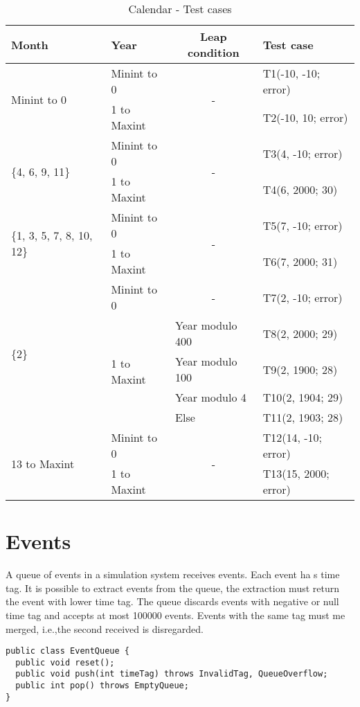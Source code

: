 \begin{table}
\centering
\small
\begin{tabular}{|l|l|c|l|}
\hline
\textbf{Month} & \textbf{Year} & \textbf{Leap condition} & \textbf{Test case} \\
\hline
\multirow{2}{*}{Minint to 0} & Minint to 0 & \multirow{2}{*}{-} & T1(-10, -10; error) \\
\cline{2-2} \cline{4-4}
& 1 to Maxint & & T2(-10, 10; error) \\
\hline
\multirow{2}{*}{\{4, 6, 9, 11\}} & Minint to 0 & \multirow{2}{*}{-} & T3(4, -10; error) \\
\cline{2-2} \cline{4-4}
& 1 to Maxint & & T4(6, 2000; 30) \\
\hline
\multirow{2}{*}{\{1, 3, 5, 7, 8, 10, 12\}} & Minint to 0 & \multirow{2}{*}{-} & T5(7, -10; error) \\
\cline{2-2} \cline{4-4}
& 1 to Maxint & & T6(7, 2000; 31) \\
\hline
\multirow{5}{*}{\{2\}} & Minint to 0 & - & T7(2, -10; error) \\
\cline{2-4}
& \multirow{4}{*}{1 to Maxint} & \multicolumn{1}{l|}{Year modulo 400} & T8(2, 2000; 29) \\
\cline{3-4}
& & \multicolumn{1}{l|}{Year modulo 100} & T9(2, 1900; 28) \\
\cline{3-4}
& & \multicolumn{1}{l|}{Year modulo 4} & T10(2, 1904; 29) \\
\cline{3-4}
& & \multicolumn{1}{l|}{Else} & T11(2, 1903; 28) \\
\hline
\multirow{2}{*}{13 to Maxint} & Minint to 0 & \multirow{2}{*}{-} & T12(14, -10; error) \\
\cline{2-2} \cline{4-4}
& 1 to Maxint & & T13(15, 2000; error) \\
\hline
\end{tabular}
\caption{Calendar - Test cases}
\label{tab:calendar_test_cases}
\end{table}

\section{Events}
A queue of events in a simulation system receives events. Each event ha s time tag. It is possible to extract events from the queue, the extraction must return the event with lower time tag. The queue discards events with negative or null time tag and accepts at most 100000 events. Events with the same tag must me merged, i.e.,\@ the second received is disregarded.
\begin{verbatim}
public class EventQueue {
  public void reset();
  public void push(int timeTag) throws InvalidTag, QueueOverflow;
  public int pop() throws EmptyQueue;
}
\end{verbatim}


